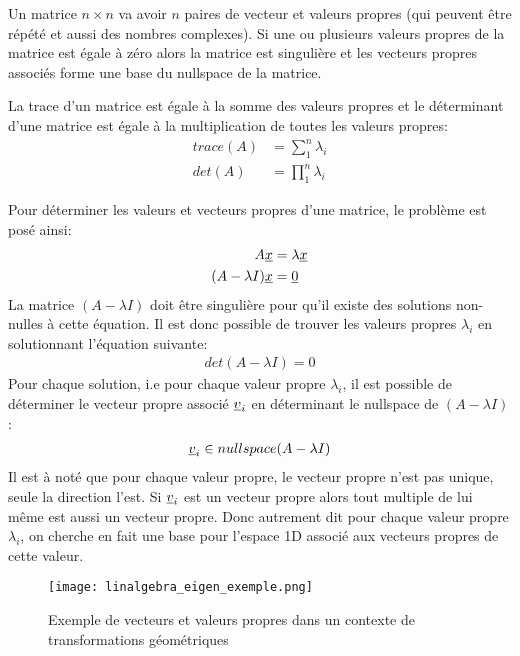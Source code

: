 Un matrice $n \times n$ va avoir $n$ paires de vecteur et valeurs propres (qui peuvent être répété et aussi des nombres complexes). Si une ou plusieurs valeurs propres de la matrice est égale à zéro alors la matrice est singulière et les vecteurs propres associés forme une base du nullspace de la matrice. 

La trace d'un matrice est égale à la somme des valeurs propres et le déterminant d'une matrice est égale à la multiplication de toutes les valeurs propres:
\begin{align}
trace(A) &= \sum_1^n{ \lambda_i } \\
det(A)   &= \prod_1^n{ \lambda_i }
\end{align}

Pour déterminer les valeurs et vecteurs propres d'une matrice, le problème est posé ainsi:
\begin{align}
A \underline{x} &= \lambda  \underline{x} \\
(A - \lambda I) \underline{x} &= \underline{0}
\end{align}
La matrice $(A - \lambda I)$ doit être singulière pour qu'il existe des solutions non-nulles à cette équation. Il est donc possible de trouver les valeurs propres $\lambda_i$ en solutionnant l'équation suivante:
\begin{align}
det(A - \lambda I) = 0
\end{align}
Pour chaque solution, i.e pour chaque valeur propre $\lambda_i$, il est possible de déterminer le vecteur propre associé $\underline{v}_i$ en déterminant le nullspace de $(A - \lambda I)$:
\begin{align}
\underline{v}_i \in nullspace(A - \lambda I)
\end{align}
Il est à noté que pour chaque valeur propre, le vecteur propre n'est pas unique, seule la direction l'est. Si $\underline{v}_i$ est un vecteur propre alors tout multiple de lui même est aussi un vecteur propre. Donc autrement dit pour chaque valeur propre $\lambda_i$, on cherche en fait une base pour l'espace 1D associé aux vecteurs propres de cette valeur.



\begin{figure}[H]
	\centering
		\texttt{[image: linalgebra\_eigen\_exemple.png]}
	\caption{Exemple de vecteurs et valeurs propres dans un contexte de transformations géométriques}
	\label{fig:linalgebra_eigen_exemple}
\end{figure}

